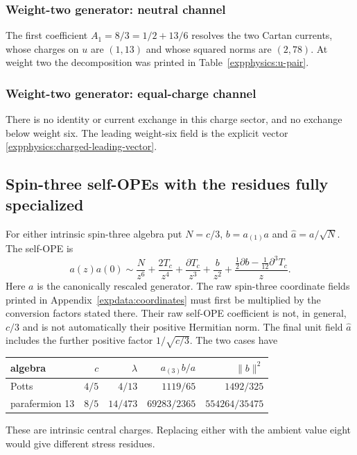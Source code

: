 \subsubsection{Weight-two generator: neutral channel}
The first coefficient $A_1=8/3=1/2+13/6$ resolves the two Cartan
currents, whose charges on $u$ are $(1,13)$ and whose squared
norms are $(2,78)$. At weight two the decomposition was printed
in Table~\ref{expphysics:u-pair}.


\subsubsection{Weight-two generator: equal-charge channel}
There is no identity or current exchange in this charge sector,
and no exchange below weight six. The leading weight-six field
is the explicit vector \eqref{expphysics:charged-leading-vector}.


\subsection{Spin-three self-OPEs with the residues fully specialized}

For either intrinsic spin-three algebra put $N=c/3$,
$b=a_{(1)}a$ and $\widehat a=a/\sqrt N$. The self-OPE is
\[
 a(z)a(0)\sim\frac{N}{z^6}+\frac{2T_c}{z^4}
 +\frac{\partial T_c}{z^3}+\frac b{z^2}
+\frac{\frac12\partial b-\frac1{12}\partial^3T_c}{z}.
\]
Here $a$ is the canonically rescaled generator. The raw spin-three
coordinate fields printed in Appendix~\ref{expdata:coordinates}
must first be multiplied by the conversion factors stated there.
Their raw self-OPE coefficient is not, in general, $c/3$ and is
not automatically their positive Hermitian norm. The final unit
field $\widehat a$ includes the further positive factor $1/\sqrt{c/3}$.
The two cases have
\begin{center}
\begin{tabular}{lrrrr}
\toprule
algebra&$c$&$\lambda$&$a_{(3)}b/a$&$\|b\|^2$\\
\midrule
Potts&$4/5$&$4/13$&$1119/65$&$1492/325$\\
parafermion 13&$8/5$&$14/473$&$69283/2365$&$554264/35475$\\
\bottomrule
\end{tabular}
\end{center}
These are intrinsic central charges. Replacing either with the
ambient value eight would give different stress residues.

